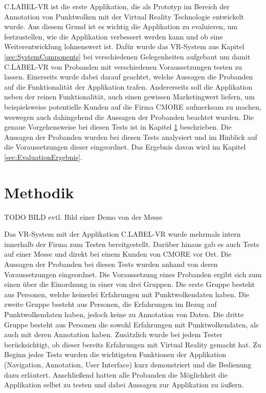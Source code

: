 C.LABEL-VR ist die erste Applikation, die als Prototyp im Bereich der Annotation von Punktwolken mit der Virtual Reality Technologie entwickelt wurde. Aus diesem Grund ist es wichtig die Applikation zu evaluieren, um festzustellen, wie die Applikation verbessert werden kann und ob eine Weiterentwicklung lohnenswert ist. Dafür wurde das VR-System aus Kapitel \ref{sec:SystemComponents} bei verschiedenen Gelegenheiten aufgebaut um damit C.LABEL-VR von Probanden mit verschiedenen Voraussetzungen testen zu lassen. Einerseits wurde dabei darauf geachtet, welche Aussagen die Probanden auf die Funktionalität der Applikation trafen. Andererseits soll die Applikation neben der reinen Funktionalität, auch einen gewissen Marketingwert liefern, um beispielsweise potentielle Kunden auf die Firma CMORE aufmerksam zu machen, weswegen auch dahingehend die Aussagen der Probanden beachtet wurden. Die genaue Vorgehensweise bei diesen Tests ist in Kapitel \ref{sec:Methodik} beschrieben. Die Aussagen der Probanden wurden bei diesen Tests analysiert und im Hinblick auf die Voraussetzungen dieser eingeordnet. Das Ergebnis davon wird im Kapitel \ref{sec:EvaluationErgebnis}.


\section{Methodik}
\label{sec:Methodik}
TODO BILD evtl. Bild einer Demo von der Messe 

Das VR-System mit der Applikation C.LABEL-VR wurde mehrmals intern innerhalb der Firma zum Testen bereitgestellt. Darüber hinaus gab es auch Tests auf einer Messe und direkt bei einem Kunden von CMORE vor Ort. Die Aussagen der Probanden bei diesen Tests wurden anhand von deren Voraussetzungen eingeordnet. Die Voraussetzung eines Probanden ergibt sich zum einen über die Einordnung in einer von drei Gruppen. Die erste Gruppe besteht aus Personen, welche keinerlei Erfahrungen mit Punktwolkendaten haben. Die zweite Gruppe besteht aus Personen, die Erfahrungen im Bezug auf Punktwolkendaten haben, jedoch keine zu Annotation von Daten. Die dritte Gruppe besteht aus Personen die sowohl Erfahrungen mit Punktwolkendaten, als auch mit deren Annotation haben. Zusätzlich wurde bei jedem Tester berücksichtigt, ob dieser bereits Erfahrungen mit Virtual Reality gemacht hat. Zu Beginn jedes Tests wurden die wichtigsten Funktionen der Applikation (Navigation, Annotation, User Interface) kurz demonstriert und die Bedienung dazu erläutert. Anschließend hatten alle Probanden die Möglichkeit die Applikation selbst zu testen und dabei Aussagen zur Applikation zu äußern.\\

